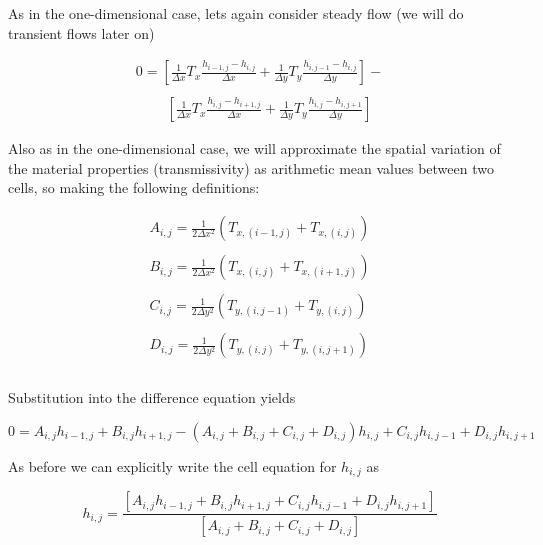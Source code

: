 As in the one-dimensional case, lets again consider steady flow (we will do transient flows later on)

\begin{equation}
\begin{matrix}
0= 
[\frac{1}{\Delta x} T_{x} \frac{h_{i-1,j} - h_{i,j}}{\Delta x} +
 \frac{1}{\Delta y} T_{y} \frac{h_{i,j-1} - h_{i,j}}{\Delta y}] - \\
~~~~~~~~~~\\
~~~~~~~~~~[ \frac{1}{\Delta x} T_{x}  \frac{h_{i,j} - h_{i+1,j}}{\Delta x} +
  \frac{1}{\Delta y}  T_{y} \frac{h_{i,j} - h_{i,j+1}}{\Delta y} ]        
\end{matrix}        
\end{equation}

Also as in the one-dimensional case, we will approximate the spatial variation of the material properties (transmissivity) as arithmetic mean values between two cells, so making the following definitions:

\begin{equation}
\begin{matrix}
A_{i,j} = \frac{1}{2 \Delta x^2}(T_{x,(i-1,j)}+T_{x,(i,j)}) \\ ~~ \\
B_{i,j} = \frac{1}{2 \Delta x^2}(T_{x,(i,j)}+T_{x,(i+1,j)})   \\ ~~ \\
C_{i,j} = \frac{1}{2 \Delta y^2}(T_{y,(i,j-1)}+T_{y,(i,j)})   \\ ~~ \\
D_{i,j} = \frac{1}{2 \Delta y^2}(T_{y,(i,j)}+T_{y,(i,j+1)})   \\ ~~ \\
\end{matrix}
\end{equation}

Substitution into the difference equation yields

\begin{equation}
0 = A_{i,j}h_{i-1,j} + B_{i,j}h_{i+1,j} - (A_{i,j}+B_{i,j}+C_{i,j}+D_{i,j})h_{i,j} + C_{i,j}h_{i,j-1} + D_{i,j}h_{i,j+1}
\end{equation}

As before we can explicitly write the cell equation for $h_{i,j}$ as

\begin{equation}
h_{i,j} = \frac{[A_{i,j}h_{i-1,j} + B_{i,j}h_{i+1,j} + C_{i,j}h_{i,j-1} + D_{i,j}h_{i,j+1}]}{[A_{i,j}+B_{i,j}+C_{i,j}+D_{i,j}]}
\end{equation}

